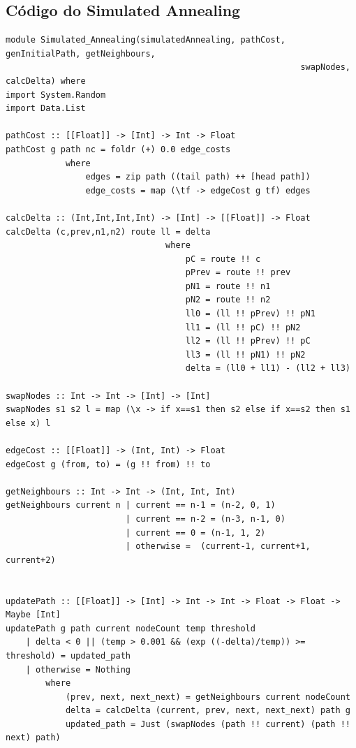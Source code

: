 \documentclass{article}
\begin{document}
\begin{appendices}
\section{Código do Simulated Annealing}

\begin{framed}
\begin{verbatim}
module Simulated_Annealing(simulatedAnnealing, pathCost, genInitialPath, getNeighbours, 
                                                           swapNodes, calcDelta) where
import System.Random
import Data.List

pathCost :: [[Float]] -> [Int] -> Int -> Float
pathCost g path nc = foldr (+) 0.0 edge_costs
            where
                edges = zip path ((tail path) ++ [head path])
                edge_costs = map (\tf -> edgeCost g tf) edges

calcDelta :: (Int,Int,Int,Int) -> [Int] -> [[Float]] -> Float
calcDelta (c,prev,n1,n2) route ll = delta
                                where
                                    pC = route !! c
                                    pPrev = route !! prev
                                    pN1 = route !! n1
                                    pN2 = route !! n2
                                    ll0 = (ll !! pPrev) !! pN1
                                    ll1 = (ll !! pC) !! pN2
                                    ll2 = (ll !! pPrev) !! pC
                                    ll3 = (ll !! pN1) !! pN2
                                    delta = (ll0 + ll1) - (ll2 + ll3)

swapNodes :: Int -> Int -> [Int] -> [Int]
swapNodes s1 s2 l = map (\x -> if x==s1 then s2 else if x==s2 then s1 else x) l

edgeCost :: [[Float]] -> (Int, Int) -> Float
edgeCost g (from, to) = (g !! from) !! to

getNeighbours :: Int -> Int -> (Int, Int, Int)
getNeighbours current n | current == n-1 = (n-2, 0, 1)
                        | current == n-2 = (n-3, n-1, 0)
                        | current == 0 = (n-1, 1, 2)
                        | otherwise =  (current-1, current+1, current+2)


updatePath :: [[Float]] -> [Int] -> Int -> Int -> Float -> Float -> Maybe [Int]
updatePath g path current nodeCount temp threshold  
    | delta < 0 || (temp > 0.001 && (exp ((-delta)/temp)) >= threshold) = updated_path
    | otherwise = Nothing
        where
            (prev, next, next_next) = getNeighbours current nodeCount
            delta = calcDelta (current, prev, next, next_next) path g
            updated_path = Just (swapNodes (path !! current) (path !! next) path)


\end{verbatim}
\end{framed}
\end{appendices}
\end{document}
